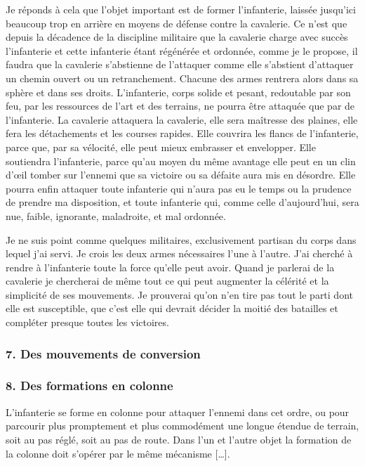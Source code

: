 \documentclass[french,twoside]{book} %
\begin{document}
Je réponds à cela que l’objet important est de former l’infanterie, laissée jusqu’ici beaucoup trop en arrière en moyens de défense contre la cavalerie. Ce n’est que depuis la décadence de la discipline militaire que la cavalerie charge avec succès l’infanterie et cette infanterie étant régénérée et ordonnée, comme je le propose, il faudra que la cavalerie s’abstienne de l’attaquer comme elle s’abstient d’attaquer un chemin ouvert ou un retranchement. Chacune des armes rentrera alors dans sa sphère et dans ses droits. L’infanterie, corps solide et pesant, redoutable par son feu, par les ressources de l’art et des terrains, ne pourra être attaquée que par de l’infanterie. La cavalerie attaquera la cavalerie, elle sera maîtresse des plaines, elle fera les détachements et les courses rapides. Elle couvrira les flancs de l’infanterie, parce que, par sa vélocité, elle peut mieux embrasser et envelopper. Elle soutiendra l’infanterie, parce qu’au moyen du même avantage elle peut en un clin d’œil tomber sur l’ennemi que sa victoire ou sa défaite aura mis en désordre. Elle pourra enfin attaquer toute infanterie qui n’aura pas eu le temps ou la prudence de prendre ma disposition, et toute infanterie qui, comme celle d’aujourd’hui, sera nue, faible, ignorante, maladroite, et mal ordonnée.\par
Je ne suis point comme quelques militaires, exclusivement partisan du corps dans lequel j’ai servi. Je crois les deux armes nécessaires l’une à l’autre. J’ai cherché à rendre à l’infanterie toute la force qu’elle peut avoir. Quand je parlerai de la cavalerie je chercherai de même tout ce qui peut augmenter la célérité et la simplicité de ses mouvements. Je prouverai qu’on n’en tire pas tout le parti dont elle est susceptible, que c’est elle qui devrait décider la moitié des batailles et compléter presque toutes les victoires.
\subsubsection[{7. Des mouvements de conversion}]{7. Des mouvements de conversion}
\noindent […]
\subsubsection[{8. Des formations en colonne}]{8. Des formations en colonne}
\noindent L’infanterie se forme en colonne pour attaquer l’ennemi dans cet ordre, ou pour parcourir plus promptement et plus commodément une longue étendue de terrain, soit au pas réglé, soit au pas de route. Dans l’un et l’autre objet la formation de la colonne doit s’opérer par le même mécanisme […].\par
\end{document}
